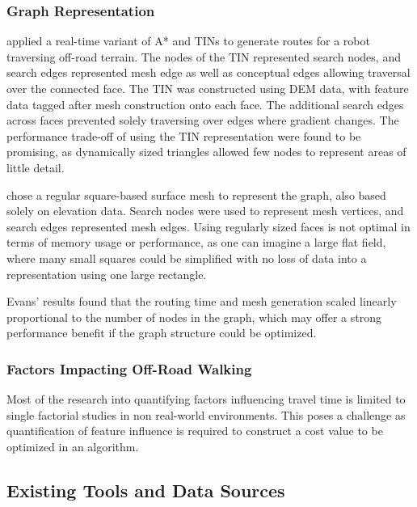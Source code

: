 \documentclass[12pt]{article}
\begin{document}
\subsubsection{Graph Representation}\label{section:context:er:graph}

\textcite{perkins2013fielddstar} applied a real-time variant of A* and TINs to generate routes for a robot traversing off-road terrain. The nodes of the TIN represented search nodes, and search edges represented mesh edge as well as conceptual edges allowing traversal over the connected face. The TIN was constructed using DEM data, with feature data tagged after mesh construction onto each face. The additional search edges across faces prevented solely traversing over edges where gradient changes. The performance trade-off of using the TIN representation were found to be promising, as dynamically sized triangles allowed few nodes to represent areas of little detail.

\textcite{evans2023tsr} chose a regular square-based surface mesh to represent the graph, also based solely on elevation data. Search nodes were used to represent mesh vertices, and search edges represented mesh edges. Using regularly sized faces is not optimal in terms of memory usage or performance, as one can imagine a large flat field, where many small squares could be simplified with no loss of data into a representation using one large rectangle.

Evans' results found that the routing time and mesh generation scaled linearly proportional to the number of nodes in the graph, which may offer a strong performance benefit if the graph structure could be optimized.


\subsubsection{Factors Impacting Off-Road Walking}

Most of the research into quantifying factors influencing travel time is limited to single factorial studies in non real-world environments. This poses a challenge as quantification of feature influence is required to construct a cost value to be optimized in an algorithm.

\subsection{Existing Tools and Data Sources}
\end{document}
